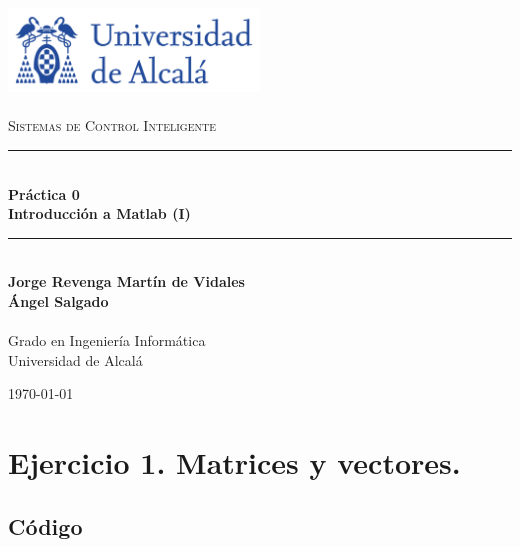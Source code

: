 \documentclass[a4paper, 12pt]{article}
\newcommand{\HRule}{\rule{\linewidth}{0.5mm}}
\begin{document}
	\begin{titlepage}
		\begin{center}
			\includegraphics[width=0.5\textwidth]{figures/logoUAH.png}~\\[2cm]
			
			\textsc{\Large \\Sistemas de Control Inteligente}\\[2cm]
			
			\HRule \\[0.4cm]
			{\LARGE \bfseries Práctica 0 \\ Introducción a Matlab (I) \\[0.4cm]}
			\HRule \\[3cm]
			
			\large\textbf{Jorge Revenga Martín de Vidales}\\
			\large\textbf{Ángel Salgado}\\
			\large\textbf{}\\ Grado en Ingeniería Informática \\ Universidad de Alcalá
			
			\vfill
			
			{\large \today}
		\end{center}
	\end{titlepage}
	
	\pagestyle{fancy}
	\fancyhf{} %
	\fancyfoot[RO,LE]{\thepage}  %
	\newpage
	
	\thispagestyle{plain}
	\tableofcontents
	\newpage
	
	\section{Ejercicio 1. Matrices y vectores.}
	
	\subsection{Código}
	\inputminted[fontsize=\scriptsize, linenos, breaklines=true, xleftmargin=0.75cm, frame=lines]{matlab}{code/Ejercicio1.m}
\end{document}
